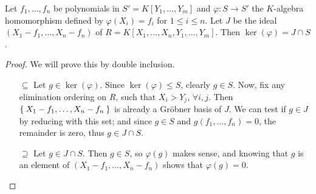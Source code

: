 \begin{problem}
Let \(f_1, \dots, f_n\) be polynomials in \(S' = K[Y_1, \dots, Y_m]\) and \(\varphi \colon S \to S'\) the \(K\)-algebra homomorphism defined by \(\varphi(X_i) = f_i\) for \(1 \leq i \leq n\). Let \(J\) be the ideal \((X_1 - f_1, \dots, X_n - f_n)\) of \(R = K[X_1, \dots, X_n, Y_1, \dots, Y_m]\). Then \(\ker(\varphi) = J \cap S\).
\end{problem}
\begin{proof}
We will prove this by double inclusion.
\begin{itemize}
    \item[\(\subseteq\)] Let \(g \in \ker(\varphi)\). Since \(\ker(\varphi) \leq S\), clearly \(g \in S\). Now, fix any elimination ordering on \(R\), such that \(X_i > Y_j\), \(\forall i, j\). Then \(\Set{ X_1 - f_1, \dots, X_n - f_n }\) is already a Gröbner basis of \(J\). We can test if \(g \in J\) by reducing with this set; and since \(g \in S\) and \(g(f_1, \dots, f_n) = 0\), the remainder is zero, thus \(g \in J \cap S\).
    
    \item[\(\supseteq\)] Let \(g \in J \cap S\). Then \(g \in S\), so \(\varphi(g)\) makes sense, and knowing that \(g\) is an element of \((X_1 - f_1, \dots, X_n - f_n)\) shows that \(\varphi(g) = 0\).
\end{itemize}
\end{proof}

\begin{comment}
\begin{problem}
Let \(f_1, \dots, f_n\) be polynomials in \(S' = K[Y_1, \dots, Y_m]\). Let \(J = (X_1 - f_1, \dots, X_n - f_n) \subset R = K[X_1, \dots, X_n, Y_1, \dots, Y_m]\) and \(G\) a GB of \(J\) w.r.t. some elimination order for \(Y_1, \dots, Y_m\). Let \(g\) be a polynomial of \(S'\) and \(h\) its reminder w.r.t. \(G\). Then:
\begin{enumerate}[(i)]
    \item \(g \in K[f_1, \dots, f_n] \iff h \in S\)
    \item If \(g \in K[f_1, \dots, f_n]\), then \(g = h(f_1, \dots, f_n)\) is a representation of \(g\) as a polynomial in \(f_1, \dots, f_n\). 
\end{enumerate}
\end{problem}
\begin{proof}
~
\begin{enumerate}[(i)]
    \item Using the homomorphism \(\varphi\) from the previous problem, by the fundamental isomorphism theorem, we get that
    \[
        \frac{K[X_1, \dots, X_n]}{\ker(\varphi)} \cong \Ima(\varphi) \cong K[f_1, \dots, f_n]
    \]
    And by the result from that problem, we know that an element of \(\) is in \(\ker(\varphi)\) iff \(\)
\end{enumerate}
\end{proof}
\end{comment}
